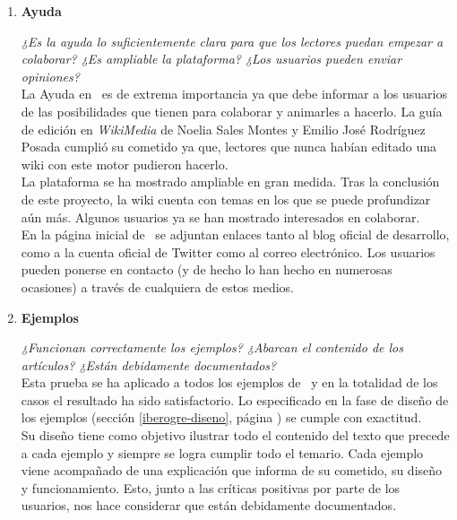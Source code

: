 \begin{enumerate}
    \item \textbf{Ayuda}
    
    \textit{¿Es la ayuda lo suficientemente clara para que los lectores
    puedan empezar a colaborar? ¿Es ampliable la plataforma? ¿Los usuarios
    pueden enviar opiniones?}\\
    
    La Ayuda en \wiki\ es de extrema importancia ya que debe informar a los
    usuarios de las posibilidades que tienen para colaborar y animarles
    a hacerlo. La guía de edición en \textit{WikiMedia} de Noelia Sales Montes
    y Emilio José Rodríguez Posada cumplió su cometido ya que, lectores
    que nunca habían editado una wiki con este motor pudieron hacerlo.\\
    
    La plataforma se ha mostrado ampliable en gran medida. Tras la conclusión
    de este proyecto, la wiki cuenta con temas en los que se puede profundizar
    aún más. Algunos usuarios ya se han mostrado interesados en colaborar.\\
    
    En la página inicial de \wiki\ se adjuntan enlaces tanto al blog oficial
    de desarrollo, como a la cuenta oficial de Twitter como al correo electrónico.
    Los usuarios pueden ponerse en contacto (y de hecho lo han hecho en numerosas
    ocasiones) a través de cualquiera de estos medios.\\
    
    \item \textbf{Ejemplos}
    
    \textit{¿Funcionan correctamente los ejemplos? ¿Abarcan el contenido
    de los artículos? ¿Están debidamente documentados?}\\
    
    Esta prueba se ha aplicado a todos los ejemplos de \wiki\ y en la totalidad
    de los casos el resultado ha sido satisfactorio. Lo especificado en la
    fase de diseño de los ejemplos (sección \ref{iberogre-diseno}, página
    \pageref{iberogre-diseno}) se cumple con exactitud.\\
    
    Su diseño tiene como objetivo ilustrar todo el contenido del texto que
    precede a cada ejemplo y siempre se logra cumplir todo el temario. Cada
    ejemplo viene acompañado de una explicación que informa de su cometido,
    su diseño y funcionamiento. Esto, junto a las críticas positivas por
    parte de los usuarios, nos hace considerar que están debidamente
    documentados.\\
    

\end{enumerate}
